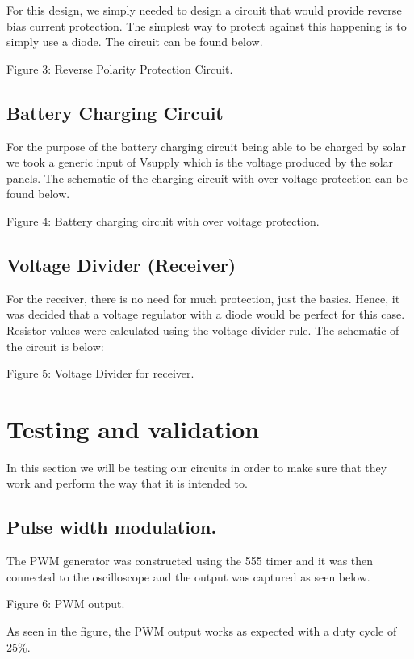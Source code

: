 \documentclass[class=report,11pt,crop=false]{standalone}
\begin{document}
For this design, we simply needed to design a circuit that would provide reverse bias current protection. The simplest way to protect against this happening is to simply use a diode. The circuit can be found below.

Figure 3: Reverse Polarity Protection Circuit.

\subsection{Battery Charging Circuit}

For the purpose of the battery charging circuit being able to be charged by solar we took a generic input of Vsupply which is the voltage produced by the solar panels. The schematic of the charging circuit with over voltage protection can be found below.

Figure 4: Battery charging circuit with over voltage protection.

\subsection{Voltage Divider (Receiver)}

For the receiver, there is no need for much protection, just the basics. Hence, it was decided that a voltage regulator with a diode would be perfect for this case. Resistor values were calculated using the voltage divider rule. The schematic of the circuit is below:

Figure 5: Voltage Divider for receiver.

\section{Testing and validation}

In this section we will be testing our circuits in order to make sure that they work and perform the way that it is intended to.

\subsection{Pulse width modulation.}

The PWM generator was constructed using the 555 timer and it was then connected to the oscilloscope and the output was captured as seen below.

Figure 6: PWM output.

As seen in the figure, the PWM output works as expected with a duty cycle of 25\%.
\end{document}
